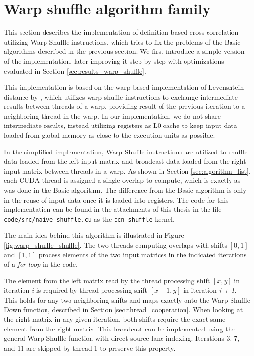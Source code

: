 \section{Warp shuffle algorithm family}
\label{sec:warp_shuffle_alg}

This section describes the implementation of definition-based cross-correlation utilizing Warp Shuffle instructions, which tries to fix the problems of the Basic algorithms described in the previous section. We first introduce a simple version of the implementation, later improving it step by step with optimizations evaluated in Section \ref{sec:results_warp_shuffle}.

This implementation is based on the warp based implementation of Levenshtein distance by \citep{paper:levenstein}, which utilizes warp shuffle instructions to exchange intermediate results between threads of a warp, providing result of the previous iteration to a neighboring thread in the warp. In our implementation, we do not share intermediate results, instead utilizing registers as L0 cache to keep input data loaded from global memory as close to the execution units as possible. 


In the simplified implementation, Warp Shuffle instructions are utilized to shuffle data loaded from the left input matrix and broadcast data loaded from the right input matrix between threads in a warp. As shown in Section \ref{sec:algorithm_list}, each CUDA thread is assigned a single overlap to compute, which is exactly as was done in the Basic algorithm. The difference from the Basic algorithm is only in the reuse of input data once it is loaded into registers. The code for this implementation can be found in the attachments of this thesis in the file \texttt{code/src/naive\_shuffle.cu} as the \texttt{ccn\_shuffle} kernel.

The main idea behind this algorithm is illustrated in Figure \ref{fig:warp_shuffle_shuffle}. The two threads computing overlaps with shifts $[0,1]$ and $[1,1]$ process elements of the two input matrices in the indicated iterations of a \textit{for loop} in the code.


The element from the left matrix read by the thread processing shift $[x, y]$ in iteration \textit{i} is required by thread processing shift $[x + 1,y]$ in iteration \textit{i + 1}. This holds for any two neighboring shifts and maps exactly onto the Warp Shuffle Down function, described in Section \ref{sec:thread_cooperation}. When looking at the right matrix in any given iteration, both shifts require the exact same element from the right matrix. This broadcast can be implemented using the general Warp Shuffle function with direct source lane indexing. Iterations 3, 7, and 11 are skipped by thread 1 to preserve this property.

